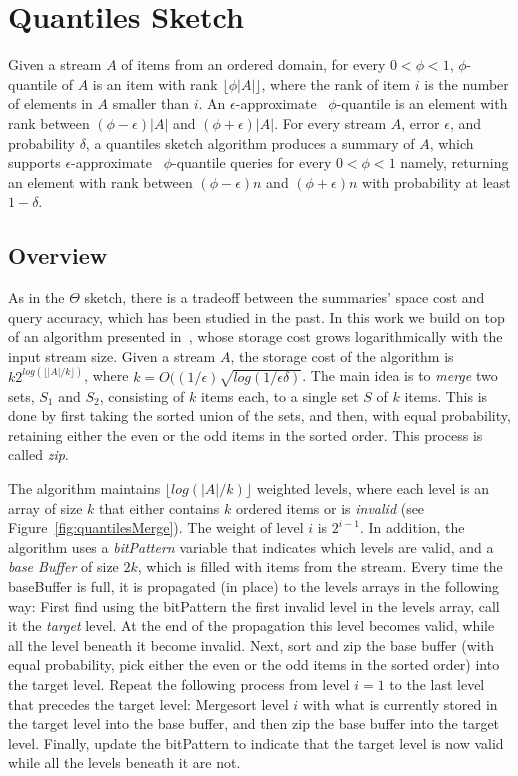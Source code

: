 \section{Quantiles Sketch}
\label{sec:quantiles}


Given a stream $A$ of items from an ordered domain, for every
$0< \phi < 1$, $\phi$-quantile of $A$ is an item with rank 
$\lfloor \phi |A| \rfloor$, where the rank of item $i$ is the
number of elements in $A$ smaller than $i$.
An $\epsilon$-approximate ~$\phi$-quantile is an element
with rank between $ (\phi-\epsilon) |A|$ and $ (\phi +
\epsilon) |A|$.
For every stream $A$, error $\epsilon$, and probability $\delta$,
a quantiles sketch algorithm produces a summary of $A$, which
supports $\epsilon$-approximate ~$\phi$-quantile queries for
every $0< \phi < 1$ namely, returning an element with rank between $(\phi-\epsilon)n$ and  $(\phi+\epsilon)n$ with probability
at least $1 - \delta$.

\subsection{Overview}
As in the $\Theta$ sketch, there
is a tradeoff between the summaries' space cost and query accuracy,
which has been  studied in the past.
In this work we build on top of an algorithm presented
in~\cite{}, whose storage cost grows logarithmically with the
input stream size.
Given a stream $A$, the storage cost of the algorithm is
$k 2^{log(\lfloor |A|/k \rfloor)}$, where $k = O((1/\epsilon)
\sqrt{log(1/\epsilon \delta)}$.
The main idea is to 
\emph{merge} two sets, $S_1$ and $S_2$, consisting of $k$ items each, to a
single set $S$ of $k$ items.  This is done by first taking the sorted union of the sets, and  
then, with equal probability, retaining either the even or the odd
items in the sorted order. 
This process is called \emph{zip}.


The algorithm maintains $\lfloor log(|A|/k) \rfloor$ weighted
levels, where each level is an array of size $k$ that either contains $k$ ordered
items or is \emph{invalid} (see Figure~\ref{fig:quantilesMerge}).
The weight of level $i$ is $2^{i-1}$.
In addition, the algorithm uses a
\emph{bitPattern} variable that indicates which levels are valid,
and a \emph{base Buffer} of size $2k$, which is filled with items
from the stream.
Every time the baseBuffer is full, it is propagated (in place) to
the levels arrays in the following way:
First find using the bitPattern the first invalid level in
the levels array, 
call it the \emph{target} level. At the end of
the propagation this level becomes valid, while all the
level beneath it become invalid.
Next, sort and zip the base buffer (with equal probability,
pick either the even or the odd items in the sorted order) into
the target level.
Repeat the following process from level $i=1$ to the
last level that precedes the target level:
Mergesort level $i$ with what is currently stored in the target
level into the base buffer, and then zip the base buffer into the
target level.
Finally, update the bitPattern to indicate that the target
level is now valid while all the levels beneath it are not.

